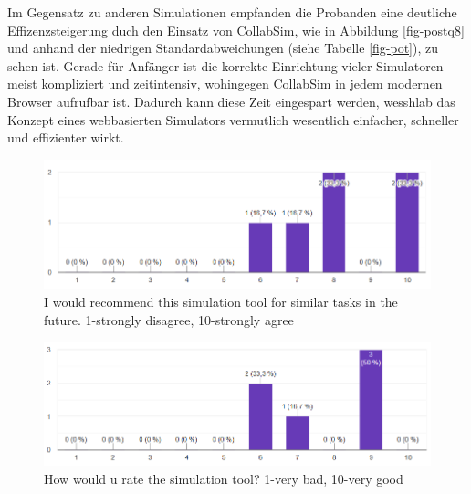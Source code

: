 \documentclass[german,version-2020-11]{uzl-thesis}
\begin{document}
  Im Gegensatz zu anderen Simulationen empfanden die Probanden eine deutliche Effizenzsteigerung duch den Einsatz von CollabSim, wie in Abbildung \vref{fig-postq8} und anhand der niedrigen Standardabweichungen (siehe Tabelle \ref{fig-pot}), zu sehen ist.
  Gerade für Anfänger ist die korrekte Einrichtung vieler Simulatoren meist kompliziert und zeitintensiv, wohingegen CollabSim in jedem modernen Browser aufrufbar ist.  
  Dadurch kann diese Zeit eingespart werden, wesshlab das Konzept eines webbasierten Simulators vermutlich wesentlich einfacher, schneller und effizienter wirkt.  

  \begin{figure}[htpb]
    \centering
    \includegraphics[scale=0.8]{figures/post_question9.png}
    \caption{I would recommend this simulation tool for similar tasks in the future. 1-strongly disagree, 10-strongly agree }
    \label{fig-postq9}
  \end{figure}
  
  \begin{figure}[htpb]
    \centering
    \includegraphics[scale=0.8]{figures/post_question10.png}
    \caption{How would u rate the simulation tool? 1-very bad, 10-very good }
    \label{fig-postq10}
  \end{figure}
  
\end{document}

